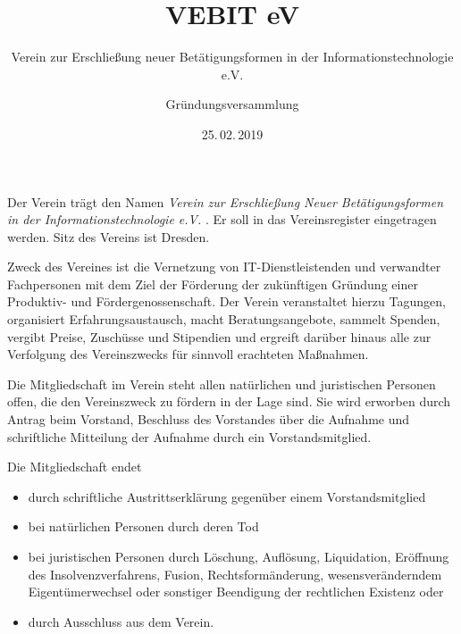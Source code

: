 \documentclass[fontsize=11pt,pagesize,parskip=half]{scrartcl}
\begin{document}
\author{Gründungsversammlung}
\subject{Satzung}
\title{VEBIT eV}
\subtitle{Verein zur Erschließung neuer Betätigungsformen in der Informationstechnologie e.V.}
\date{25.\,02.\,2019}
\maketitle



\appendix

\begin{contract}


Der Verein trägt den Namen \emph{Verein zur Erschließung Neuer Betätigungsformen in der Informationstechnologie e.V.} .
Er soll in das Vereinsregister eingetragen werden.
Sitz des Vereins ist Dresden.


Zweck des Vereines ist die Vernetzung von IT-Dienstleistenden und verwandter Fachpersonen mit dem Ziel der Förderung der zukünftigen Gründung einer Produktiv- und Fördergenossenschaft.
Der Verein veranstaltet hierzu Tagungen, organisiert Erfahrungsaustausch, macht Beratungsangebote, sammelt Spenden, vergibt Preise, Zuschüsse und Stipendien und ergreift darüber hinaus alle zur Verfolgung des Vereinszwecks für sinnvoll erachteten Maßnahmen.



Die Mitgliedschaft im Verein steht allen natürlichen und juristischen Personen offen, die den Vereinszweck zu fördern in der Lage sind.
Sie wird erworben durch Antrag beim Vorstand, Beschluss des Vorstandes über die Aufnahme und schriftliche Mitteilung der Aufnahme durch ein Vorstandsmitglied.

Die Mitgliedschaft endet
\begin{itemize}
\item durch schriftliche Austrittserklärung gegenüber einem Vorstandsmitglied
\item bei natürlichen Personen durch deren Tod
\item bei juristischen Personen durch Löschung, Auflösung, Liquidation, Eröffnung des Insolvenzverfahrens, Fusion, Rechtsformänderung, wesensveränderndem Eigentümerwechsel oder sonstiger Beendigung der rechtlichen Existenz oder
\item durch Ausschluss aus dem Verein.
\end{itemize}


\end{contract}
\end{document}
